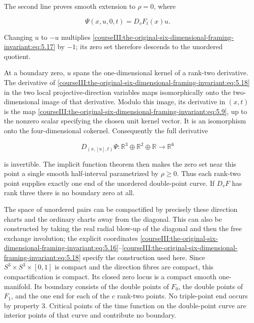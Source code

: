The second line proves smooth extension to \(\rho=0\), where

\begin{equation}
\Psi(x,u,0,t)=D_vF_t(x)u.
 \label{courseIII:the-original-six-dimensional-framing-invariant:eq:5.18}
\end{equation}

Changing \(u\) to \(-u\) multiplies \eqref{courseIII:the-original-six-dimensional-framing-invariant:eq:5.17} by \(-1\); its zero set therefore descends to the unordered quotient.

At a boundary zero, \(u\) spans the one-dimensional kernel of a rank-two derivative. The derivative of \eqref{courseIII:the-original-six-dimensional-framing-invariant:eq:5.18} in the two local projective-direction variables maps isomorphically onto the two-dimensional image of that derivative. Modulo this image, its derivative in \((x,t)\) is the map \eqref{courseIII:the-original-six-dimensional-framing-invariant:eq:5.9}, up to the nonzero scalar specifying the chosen unit kernel vector. It is an isomorphism onto the four-dimensional cokernel. Consequently the full derivative

\begin{equation}
D_{(x,[u],t)}\Psi:\mathbb R^3\oplus\mathbb R^2\oplus\mathbb R
                                     \longrightarrow\mathbb R^6
 \label{courseIII:the-original-six-dimensional-framing-invariant:eq:5.19}
\end{equation}

is invertible. The implicit function theorem then makes the zero set near this point a single smooth half-interval parametrized by \(\rho\ge0\). Thus each rank-two point supplies exactly one end of the unordered double-point curve. If \(D_vF\) has rank three there is no boundary zero at all.

The space of unordered pairs can be compactified by precisely these direction charts and the ordinary charts away from the diagonal. This can also be constructed by taking the real radial blow-up of the diagonal and then the free exchange involution; the explicit coordinates \eqref{courseIII:the-original-six-dimensional-framing-invariant:eq:5.16}--\eqref{courseIII:the-original-six-dimensional-framing-invariant:eq:5.18} specify the construction used here. Since \(S^3\times S^3\times[0,1]\) is compact and the direction fibres are compact, this compactification is compact. Its closed zero locus is a compact smooth one-manifold. Its boundary consists of the double points of \(F_0\), the double points of \(F_1\), and the one end for each of the \(c\) rank-two points. No triple-point end occurs by property 3. Critical points of the time function on the double-point curve are interior points of that curve and contribute no boundary.

